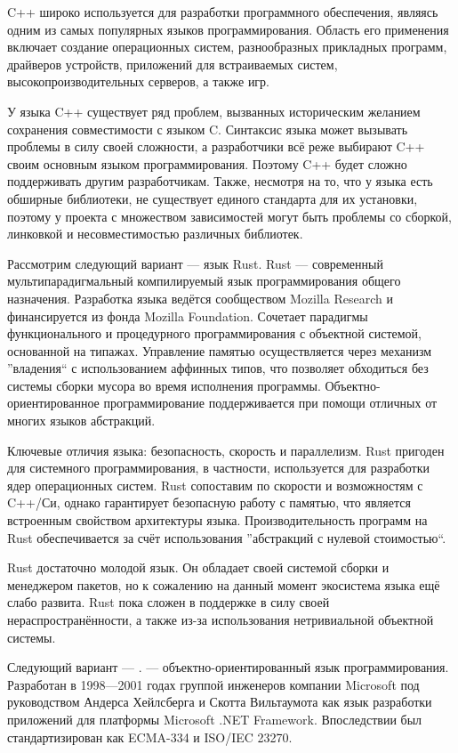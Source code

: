 C++ широко используется для разработки программного обеспечения, являясь одним из самых популярных языков программирования. Область его применения включает создание операционных систем, разнообразных прикладных программ, драйверов устройств, приложений для встраиваемых систем, высокопроизводительных серверов, а также игр.

У языка C++ существует ряд проблем, вызванных историческим желанием сохранения совместимости с языком C. Синтаксис языка может вызывать проблемы в силу своей сложности, а разработчики всё реже выбирают C++ своим основным языком программирования. Поэтому C++ будет сложно поддерживать другим разработчикам. Также, несмотря на то, что у языка есть обширные библиотеки, не существует единого стандарта для их установки, поэтому у проекта с множеством зависимостей могут быть проблемы со сборкой, линковкой и несовместимостью различных библиотек.


Рассмотрим следующий вариант — язык Rust. Rust — современный мультипарадигмальный компилируемый язык программирования общего назначения. Разработка языка ведётся сообществом Mozilla Research и финансируется из фонда Mozilla Foundation. Сочетает парадигмы функционального и процедурного программирования с объектной системой, основанной на типажах. Управление памятью осуществляется через механизм ''владения`` с использованием аффинных типов, что позволяет обходиться без системы сборки мусора во время исполнения программы. Объектно-ориентированное программирование поддерживается при помощи отличных от многих языков абстракций.

Ключевые отличия языка: безопасность, скорость и параллелизм. Rust пригоден для системного программирования, в частности, используется для разработки ядер операционных систем. Rust сопоставим по скорости и возможностям с C++/Си, однако гарантирует безопасную работу с памятью, что является встроенным свойством архитектуры языка. Производительность программ на Rust обеспечивается за счёт использования ''абстракций с нулевой стоимостью``.

Rust достаточно молодой язык. Он обладает своей системой сборки и менеджером пакетов, но к сожалению на данный момент экосистема языка ещё слабо развита. Rust пока сложен в поддержке в силу своей нераспространённости, а также из-за использования нетривиальной объектной системы.


Следующий вариант — \csharp. \csharp — объектно-ориентированный язык программирования. Разработан в 1998—2001 годах группой инженеров компании Microsoft под руководством Андерса Хейлсберга и Скотта Вильтаумота как язык разработки приложений для платформы Microsoft .NET Framework. Впоследствии был стандартизирован как ECMA-334 и ISO/IEC 23270.

